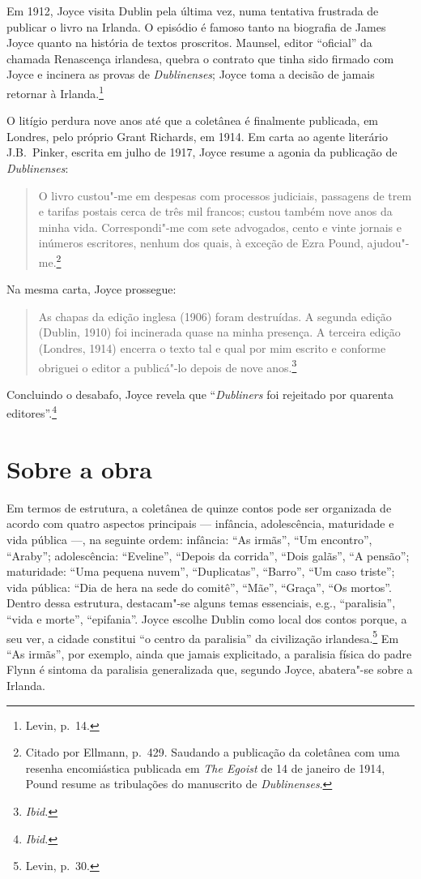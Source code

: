 Em 1912, Joyce visita Dublin pela última vez, numa tentativa frustrada de
publicar o livro na Irlanda. O episódio é famoso tanto na biografia de James
Joyce quanto na história de textos proscritos. Maunsel, editor “oficial” da
chamada Renascença irlandesa, quebra o contrato que tinha sido firmado com
Joyce e incinera as provas de \textit{Dublinenses}; Joyce toma a decisão de
jamais retornar à Irlanda.\footnote{ Levin, p.~14.}

O litígio perdura nove anos até que a coletânea é finalmente publicada, em
Londres, pelo próprio Grant Richards, em 1914. Em carta ao agente literário J.B.~Pinker,
escrita em julho de 1917, Joyce resume a agonia da publicação de
\textit{Dublinenses}: 

\begin{quote}
O livro custou"-me em despesas com processos judiciais,
passagens de trem e tarifas postais cerca de três mil francos; custou também
nove anos da minha vida.  Correspondi"-me com sete advogados, cento e vinte
jornais e inúmeros escritores, nenhum dos quais, à exceção de Ezra Pound,
ajudou"-me.\footnote{  Citado por Ellmann, p.~429. Saudando a publicação da
coletânea com uma resenha encomiástica publicada em \textit{The
Egoist} de 14 de janeiro de 1914, Pound resume as tribulações do
manuscrito de \textit{Dublinenses}.} 
\end{quote}

Na mesma carta, Joyce prossegue: 

\begin{quote}
As chapas da edição inglesa (1906) foram destruídas. A segunda edição (Dublin, 1910) foi
incinerada quase na minha presença. A terceira edição (Londres, 1914) encerra o
texto tal e qual por mim escrito e conforme obriguei o editor a publicá"-lo
depois de nove anos.\footnote{ \textit{Ibid.}}
\end{quote}

Concluindo o desabafo, Joyce revela que
“\textit{Dubliners} foi rejeitado por quarenta editores”.\footnote{ \textit{Ibid.}}

\section{Sobre a obra}

Em termos de estrutura, a coletânea de quinze contos pode ser organizada de
acordo com quatro aspectos principais --- infância, adolescência, maturidade
e vida pública ---, na seguinte ordem: infância: “As irmãs”, “Um encontro”,
“Araby”; adolescência: “Eveline”, “Depois da corrida”, “Dois galãs”, “A
pensão”; maturidade: “Uma pequena nuvem”, “Duplicatas”, “Barro”, “Um caso
triste”; vida pública: “Dia de hera na sede do comitê”, “Mãe”, “Graça”, “Os
mortos”. Dentro dessa estrutura, destacam"-se alguns temas essenciais, e.g.,
“paralisia”, “vida e morte”, “epifania”.  Joyce escolhe Dublin como local dos
contos porque, a seu ver, a cidade constitui “o centro da paralisia” da
civilização irlandesa.\footnote{ Levin, p.~30.} Em “As irmãs”, por exemplo, ainda que
jamais explicitado, a paralisia física do padre Flynn é sintoma da paralisia
generalizada que, segundo Joyce, abatera"-se sobre a Irlanda.

